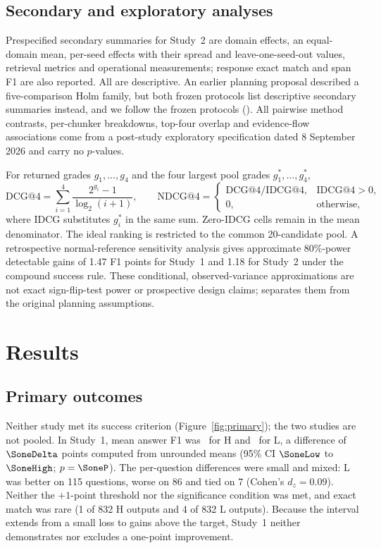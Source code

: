 \subsection{Secondary and exploratory analyses}
Prespecified secondary summaries for Study~2 are domain effects, an equal-domain mean, per-seed effects with their spread and leave-one-seed-out values, retrieval metrics and operational measurements; response exact match and span F1 are also reported. All are descriptive. An earlier planning proposal described a five-comparison Holm family, but both frozen protocols list descriptive secondary summaries instead, and we follow the frozen protocols (). All pairwise method contrasts, per-chunker breakdowns, top-four overlap and evidence-flow associations come from a post-study exploratory specification dated 8 September 2026 and carry no $p$-values.

For returned grades $g_1,\ldots,g_4$ and the four largest pool grades $g^*_1,\ldots,g^*_4$,
\begin{equation}
\mathrm{DCG}@4=\sum_{i=1}^4\frac{2^{g_i}-1}{\log_2(i+1)},\qquad
\mathrm{NDCG}@4=\begin{cases}\mathrm{DCG}@4/\mathrm{IDCG}@4,&\mathrm{IDCG}@4>0,\\0,&\mathrm{otherwise},\end{cases}
\end{equation}
where IDCG substitutes $g_i^*$ in the same sum. Zero-IDCG cells remain in the mean denominator. The ideal ranking is restricted to the common 20-candidate pool. A retrospective normal-reference sensitivity analysis gives approximate 80\%-power detectable gains of 1.47 F1 points for Study~1 and 1.18 for Study~2 under the compound success rule. These conditional, observed-variance approximations are not exact sign-flip-test power or prospective design claims;  separates them from the original planning assumptions.

\section{Results}
\subsection{Primary outcomes}
Neither study met its success criterion (Figure~\ref{fig:primary}); the two studies are not pooled. In Study~1, mean answer F1 was \SoneH\ for H and \SoneL\ for L, a difference of $\SoneDelta$ points computed from unrounded means (95\% CI $\SoneLow$ to $\SoneHigh$; $p=\SoneP$). The per-question differences were small and mixed: L was better on 115 questions, worse on 86 and tied on 7 (Cohen's $d_z=0.09$). Neither the $+1$-point threshold nor the significance condition was met, and exact match was rare (1 of 832 H outputs and 4 of 832 L outputs). Because the interval extends from a small loss to gains above the target, Study~1 neither demonstrates nor excludes a one-point improvement.


